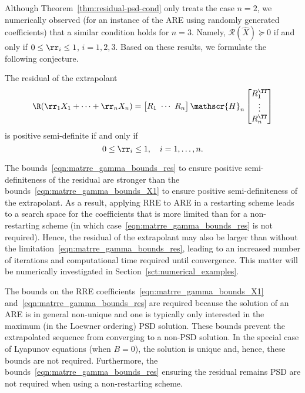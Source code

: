 Although Theorem~\ref{thm:residual-psd-cond} only treats the case $n = 2$, we numerically observed (for an instance of the \ac{ARE} using randomly generated coefficients) that a similar condition holds for $n = 3$.
Namely, $\mathscr{R}(\widehat{X}) \succeq 0$ if and only if $0 \leq \rr_i \leq 1$, $i = 1, 2, 3$.
Based on these results, we formulate the following conjecture.

\begin{conjecture}\label{conj:are_rre_residual}
The residual of the extrapolant
\begin{equation*}
	\R(\rr_1X_1 + \cdots + \rr_n X_n) =
	\begin{bmatrix}
		R_1 \ \cdots \ R_n
	\end{bmatrix}\mathscr{H}_n\begin{bmatrix}
		R_1^\TT \\ \vdots \\ R_n^\TT
	\end{bmatrix}
\end{equation*}
is positive semi-definite if and only if
\begin{equation}
	0\le \rr_i \le 1, \quad i = 1, \ldots, n.
	\label{eqn:matrre_gamma_bounds_res}
\end{equation}
\end{conjecture}

The bounds~\eqref{eqn:matrre_gamma_bounds_res} to ensure positive semi-definiteness of the residual are stronger than the bounds~\eqref{eqn:matrre_gamma_bounds_X1} to ensure positive semi-definiteness of the extrapolant.
As a result, applying \ac{RRE} to \ac{ARE} in a restarting scheme leads to a search space for the coefficients that is more limited than for a non-restarting scheme (in which case~\eqref{eqn:matrre_gamma_bounds_res} is not required).
Hence, the residual of the extrapolant may also be larger than without the limitation~\eqref{eqn:matrre_gamma_bounds_res}, leading to an increased number of iterations and computational time required until convergence.
This matter will be numerically investigated in Section~\ref{sct:numerical_examples}.

The bounds on the \ac{RRE} coefficients~\eqref{eqn:matrre_gamma_bounds_X1} and~\eqref{eqn:matrre_gamma_bounds_res} are required because the solution of an \ac{ARE} is in general non-unique and one is typically only interested in the maximum (in the Loewner ordering) \ac{PSD} solution.
These bounds prevent the extrapolated sequence from converging to a non-\ac{PSD} solution.
In the special case of Lyapunov equations (when $B = 0$), the solution is unique and, hence, these bounds are not required.
Furthermore, the bounds~\eqref{eqn:matrre_gamma_bounds_res} ensuring the residual remains \ac{PSD} are not required when using a non-restarting scheme.

